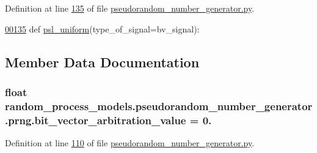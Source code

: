 Definition at line \hyperlink{pseudorandom__number__generator_8py_source_l00135}{135} of file \hyperlink{pseudorandom__number__generator_8py_source}{pseudorandom\+\_\+number\+\_\+generator.\+py}.


\begin{DoxyCode}
\hypertarget{classrandom__process__models_1_1pseudorandom__number__generator_1_1prng_l00135}{}\hyperlink{classrandom__process__models_1_1pseudorandom__number__generator_1_1prng_a1dcc8cc1bddef1852a007afc2f115f5e}{00135}     \textcolor{keyword}{def }\hyperlink{classrandom__process__models_1_1pseudorandom__number__generator_1_1prng_a1dcc8cc1bddef1852a007afc2f115f5e}{psl\_uniform}(type\_of\_signal=bv\_signal):
\end{DoxyCode}


\subsection{Member Data Documentation}
\hypertarget{classrandom__process__models_1_1pseudorandom__number__generator_1_1prng_ac3727731f4680b560c9856dce63b59b5}{}
\subsubsection[{bit\+\_\+vector\+\_\+arbitration\+\_\+value}]{\setlength{\rightskip}{0pt plus 5cm}float random\+\_\+process\+\_\+models.\+pseudorandom\+\_\+number\+\_\+generator.\+prng.\+bit\+\_\+vector\+\_\+arbitration\+\_\+value = 0.\hspace{0.3cm}{\ttfamily [static]}}\label{classrandom__process__models_1_1pseudorandom__number__generator_1_1prng_ac3727731f4680b560c9856dce63b59b5}


Definition at line \hyperlink{pseudorandom__number__generator_8py_source_l00110}{110} of file \hyperlink{pseudorandom__number__generator_8py_source}{pseudorandom\+\_\+number\+\_\+generator.\+py}.

\hypertarget{classrandom__process__models_1_1pseudorandom__number__generator_1_1prng_a82f57253641d85b4e2efba66fac47066}{}
